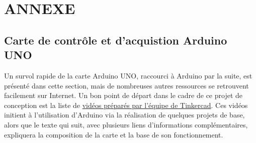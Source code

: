 \documentclass[english,french,12pt]{article}
\begin{document}

\newpage
%
\justify
\section*{ANNEXE}
\label{sec:annexe}
\subsection*{Carte de contrôle et d'acquistion Arduino UNO}
Un survol rapide de la carte Arduino UNO, raccourci à Arduino par la suite, est présenté dans cette section, mais de nombreuses autres ressources se retrouvent facilement sur Internet. Un bon point de départ dans le cadre de ce projet de conception est la liste de \href{https://www.youtube.com/playlist?list=PLV6cmKvnKRs5geApVORPW79U6s3wpa0Ht}{vidéos préparés par l'équipe de Tinkercad}. Ces vidéos initient à l'utilisation d'Arduino via la réalisation de quelques projets de base, alors que le texte qui suit, avec plusieurs liens d'informations complémentaires, expliquera la composition de la carte et la base de son fonctionnement. 
\end{document}
